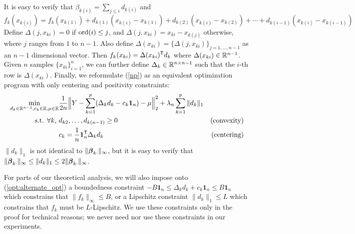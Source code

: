 It is easy to verify that $\beta_{k(i)} = \sum_{j \leq i} d_{k(i)}$ and 
\[
f_k(x_{k(i)}) = f_k({x_{k(1)}}) +d_{k(1)} ( x_{k(i)}
- x_{k(1)}) + d_{k(2)} ( x_{k(i)} - x_{k(2)}) + \cdots + d_{k(i-1)} ( x_{k(i)} - x_{k(i-1)})
\]
Define $\Delta(j, x_{ki}) = 0$ if $\textrm{ord}(i) \leq j$, and
$\Delta(j,x_{ki})= x_{ki} -
x_{k(j)}$ otherwise, where $j$ ranges from $1$ to $n-1$.  Also define
$\Delta(x_{ki}) = \{ \Delta(j, x_{ki}) \}_{j=1, \ldots ,n-1}$ as an
$n-1$ dimensional vector. Then $f_k(x_{ki}) = \Delta(x_{ki})^{\mathsf{T}} d_{k}$ where $\Delta(x_{ki}) \in {\mathbb R}^{n-1}$. Given $n$ samples $\{x_{ki}\}_{i=1}^n$, we can further define $\Delta_k \in {\mathbb R}^{n \times n-1}$ such that the $i$-th row is $\Delta(x_{ki})$. Finally, we reformulate (\ref{np}) as an equivalent optimization program with only centering and positivity constraints:
\begin{align}
\min_{d_k \in {\mathbb R}^{n-1}, c_k \in {\mathbb R},\mu \in {\mathbb R}}& \frac{1}{2n} 
               \Bigl\| Y - \sum_{k=1}^p ( \Delta_k d_k - c_k \mbox{\boldmath $1$}_n) -\mu \Bigr\|_2^2 
               + \lambda_n \sum_{k=1}^p \|d_k\|_1  & \label{opt:alternate_opt} \\
\textrm{s.t. $\forall k$, }  & d_{k2}, \ldots , d_{k(n-1)} \geq 0 	\qquad &\textrm{(convexity)} \nonumber \\ 
	& c_k = \frac{1}{n} \mbox{\boldmath $1$}_n^{\mathsf{T}} \Delta_k d_k 	\qquad &\textrm{(centering)} \nonumber 
\end{align}
$\|d_k\|_1$ is not identical to $\|\boldsymbol{\beta}_{k\cdot}\|_{\infty}$, but it is easy to verify that $\|\boldsymbol{\beta}_{k\cdot}\|_{\infty} \leq \|d_k\|_1 \leq 2\|\boldsymbol{\beta}_{k\cdot}\|_{\infty}$.

\begin{remark}
\label{rem:bounded_lipschitz_constraints}
For parts of our theoretical analysis, we will also impose onto (\ref{opt:alternate_opt}) a boundedness constraint $-B \mathbf{1}_n \leq \Delta_k d_k + c_k \mathbf{1}_n \leq B \mathbf{1}_n$ which constrains that $\|f_k \|_\infty \leq B$, or a Lipschitz constraint $\|d_k\|_1 \leq L$ which constrains that $f_k$ must be $L$-Lipschitz. We use these constraints only in the proof for technical reasons; we never need nor use these constraints in our experiments.
\end{remark}


